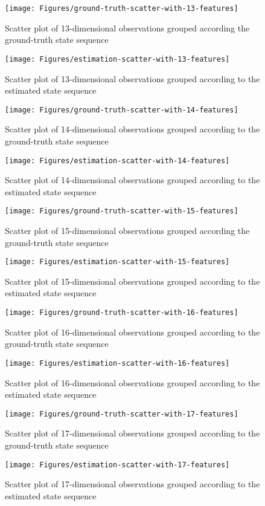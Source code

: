 	\begin{figure}[ht!]
		\texttt{[image: Figures/ground-truth-scatter-with-13-features]}
		\caption{Scatter plot of  13-dimensional observations grouped according the ground-truth state sequence}
		\label{fig:gt-13dim}
	\end{figure}
	\begin{figure}[ht!]
		\texttt{[image: Figures/estimation-scatter-with-13-features]}
		\caption{Scatter plot of 13-dimensional observations grouped according to the estimated state sequence}
		\label{fig:es-13dim}
	\end{figure}
	
	\begin{figure}[ht!]
		\texttt{[image: Figures/ground-truth-scatter-with-14-features]}
		\caption{Scatter plot of 14-dimensional observations grouped according to the ground-truth state sequence}
		\label{fig:gt-14dim}
	\end{figure}
	
	\begin{figure}[ht!]
		\texttt{[image: Figures/estimation-scatter-with-14-features]}
		\caption{Scatter plot of 14-dimensional observations grouped according to the estimated state sequence}
		\label{fig:es-14dim}
	\end{figure}
	
	\begin{figure}[ht!]
		\texttt{[image: Figures/ground-truth-scatter-with-15-features]}
		\caption{Scatter plot of  15-dimensional observations grouped according the ground-truth state sequence}
		\label{fig:gt-15dim}
	\end{figure}
	\begin{figure}[ht!]
		\texttt{[image: Figures/estimation-scatter-with-15-features]}
		\caption{Scatter plot of 15-dimensional observations grouped according to the estimated state sequence}
		\label{fig:es-15dim}
	\end{figure}
	
	\begin{figure}[ht!]
		\texttt{[image: Figures/ground-truth-scatter-with-16-features]}
		\caption{Scatter plot of 16-dimensional observations grouped according to the ground-truth state sequence}
		\label{fig:gt-16dim}
	\end{figure}
	
	\begin{figure}[ht!]
		\texttt{[image: Figures/estimation-scatter-with-16-features]}
		\caption{Scatter plot of 16-dimensional observations grouped according to the estimated state sequence}
		\label{fig:es-16dim}
	\end{figure}

	\begin{figure}[ht!]
	\texttt{[image: Figures/ground-truth-scatter-with-17-features]}
	\caption{Scatter plot of 17-dimensional observations grouped according to the ground-truth state sequence}
	\label{fig:gt-17dim}
	\end{figure}

	\begin{figure}[ht!]
		\texttt{[image: Figures/estimation-scatter-with-17-features]}
		\caption{Scatter plot of 17-dimensional observations grouped according to the estimated state sequence}
		\label{fig:es-17dim}
	\end{figure}
